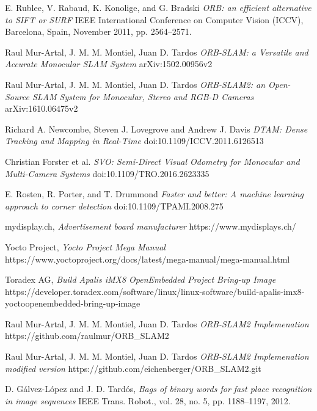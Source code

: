 \documentclass[11pt,a4paper,titlepage,oneside]{report}
\begin{document}
\begin{thebibliography}{1}

	E. Rublee, V. Rabaud, K. Konolige, and G. Bradski
	\textit{ORB: an efficient alternative to SIFT or SURF} 
	IEEE International Conference on Computer Vision (ICCV), Barcelona, Spain, November 2011, pp. 2564–2571.

  Raul Mur-Artal, J. M. M. Montiel, Juan D. Tardos
  \textit{ORB-SLAM: a Versatile and Accurate Monocular SLAM System}
  arXiv:1502.00956v2

  Raul Mur-Artal, J. M. M. Montiel, Juan D. Tardos
  \textit{ORB-SLAM2: an Open-Source SLAM System for Monocular, Stereo and RGB-D Cameras}
	arXiv:1610.06475v2 

	Richard A. Newcombe, Steven J. Lovegrove and Andrew J. Davis
	\textit{DTAM: Dense Tracking and Mapping in Real-Time}
	doi:10.1109/ICCV.2011.6126513

	Christian Forster et al.
	\textit{SVO: Semi-Direct Visual Odometry for Monocular and Multi-Camera Systems}
	doi:10.1109/TRO.2016.2623335

	E. Rosten, R. Porter, and T. Drummond 
	\textit{Faster and better: A machine learning approach to corner detection}
	doi:10.1109/TPAMI.2008.275


	mydisplay.ch,
	\textit{Advertisement board manufacturer}
	https://www.mydisplays.ch/

	Yocto Project,
	\textit{Yocto Project Mega Manual}
	https://www.yoctoproject.org/docs/latest/mega-manual/mega-manual.html

	Toradex AG,
	\textit{Build Apalis iMX8 OpenEmbedded Project Bring-up Image}
	https://developer.toradex.com/software/linux/linux-software/build-apalis-imx8-yoctoopenembedded-bring-up-image

  Raul Mur-Artal, J. M. M. Montiel, Juan D. Tardos
  \textit{ORB-SLAM2 Implemenation}
	https://github.com/raulmur/ORB\_SLAM2

  Raul Mur-Artal, J. M. M. Montiel, Juan D. Tardos
  \textit{ORB-SLAM2 Implemenation modified version}
	https://github.com/eichenberger/ORB\_SLAM2.git

	D. Gálvez-López and J. D. Tardós,
	\textit{Bags of binary words for fast place recognition in image sequences}
	IEEE Trans. Robot., vol. 28, no. 5, pp. 1188–1197, 2012.


\end{thebibliography}
\end{document}
